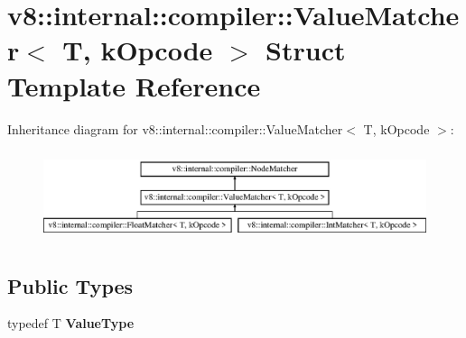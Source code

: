 \hypertarget{structv8_1_1internal_1_1compiler_1_1_value_matcher}{}\section{v8\+:\+:internal\+:\+:compiler\+:\+:Value\+Matcher$<$ T, k\+Opcode $>$ Struct Template Reference}
\label{structv8_1_1internal_1_1compiler_1_1_value_matcher}
Inheritance diagram for v8\+:\+:internal\+:\+:compiler\+:\+:Value\+Matcher$<$ T, k\+Opcode $>$\+:\begin{figure}[H]
\begin{center}
\leavevmode
\includegraphics[height=2.683706cm]{structv8_1_1internal_1_1compiler_1_1_value_matcher}
\end{center}
\end{figure}
\subsection*{Public Types}
\begin{DoxyCompactItemize}
\item 
typedef T {\bfseries Value\+Type}\hypertarget{structv8_1_1internal_1_1compiler_1_1_value_matcher_aa77e418e584a0979aacdce651384a896}{}\label{structv8_1_1internal_1_1compiler_1_1_value_matcher_aa77e418e584a0979aacdce651384a896}

\end{DoxyCompactItemize}
